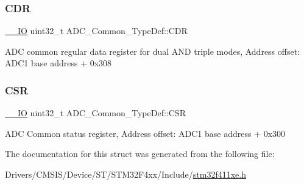 \subsubsection{\texorpdfstring{C\+DR}{CDR}}
{\footnotesize\ttfamily \hyperlink{core__sc300_8h_aec43007d9998a0a0e01faede4133d6be}{\+\_\+\+\_\+\+IO} uint32\+\_\+t A\+D\+C\+\_\+\+Common\+\_\+\+Type\+Def\+::\+C\+DR}

A\+DC common regular data register for dual A\+ND triple modes, Address offset\+: A\+D\+C1 base address + 0x308 \mbox{\label{struct_a_d_c___common___type_def_ac38e24f600f9e134a54a0c43b976a4f4}} 
\subsubsection{\texorpdfstring{C\+SR}{CSR}}
{\footnotesize\ttfamily \hyperlink{core__sc300_8h_aec43007d9998a0a0e01faede4133d6be}{\+\_\+\+\_\+\+IO} uint32\+\_\+t A\+D\+C\+\_\+\+Common\+\_\+\+Type\+Def\+::\+C\+SR}

A\+DC Common status register, Address offset\+: A\+D\+C1 base address + 0x300 

The documentation for this struct was generated from the following file\+:\begin{DoxyCompactItemize}
\item 
Drivers/\+C\+M\+S\+I\+S/\+Device/\+S\+T/\+S\+T\+M32\+F4xx/\+Include/\hyperlink{stm32f411xe_8h}{stm32f411xe.\+h}\end{DoxyCompactItemize}
